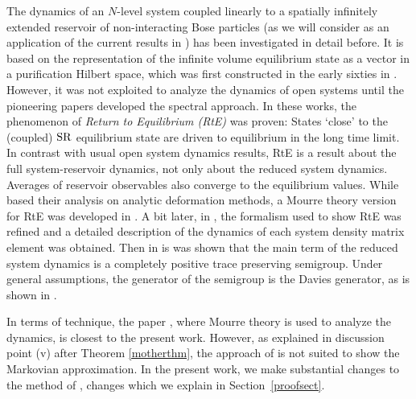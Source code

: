 \documentclass[letterpaper,onecolumn,11pt,accepted=2021-12-09]{quantumarticle}
\numberwithin{equation}{section}
\renewcommand{\r}{{\rm R}}
\newcommand{\s}{{\rm S}}
\begin{document}
The dynamics of an $N$-level system coupled linearly to a spatially infinitely extended reservoir of non-interacting Bose particles (as we will consider as an application of the current results in \cite{Markov2, Mcorr}) has been investigated in detail before. It is based on the representation of the infinite volume equilibrium state as a vector in a purification Hilbert space, which was first constructed in the early sixties in \cite{AW}. However, it was not exploited to analyze the dynamics of open systems until the pioneering papers \cite{JPrte,BFS} developed the spectral approach. In these works, the phenomenon of {\em Return to Equilibrium (RtE)} was proven: States `close' to the (coupled) $\s\r$ equilibrium state are driven to equilibrium in the long time limit. In contrast with usual open system dynamics results, RtE is a result about the full system-reservoir dynamics, not only about the reduced system dynamics. Averages of reservoir observables also converge to the equilibrium values. While \cite{JPrte,BFS} based their analysis on analytic deformation methods, a Mourre theory version for RtE was developed in \cite{FM,M}. A bit later, in \cite{MBS}, the formalism used to show RtE was refined and a detailed description of the dynamics of each system density matrix element was obtained.  Then in \cite{KM1,KM2,MAOP} is was shown that the main term of the reduced system dynamics is a completely positive trace preserving semigroup. Under general assumptions, the generator of the semigroup is the Davies generator, as is shown in \cite{MAOP}. 



In terms of technique, the paper \cite{KM1}, where Mourre theory is used to analyze the dynamics, is closest to the present work. However, as explained in discussion point (v) after Theorem \ref{motherthm}, the approach of \cite{KM1} is not suited to show the Markovian approximation. In the present work, we make substantial changes to the method of \cite{ KM1}, changes which we explain in Section~\ref{proofsect}.
\medskip
\end{document}
